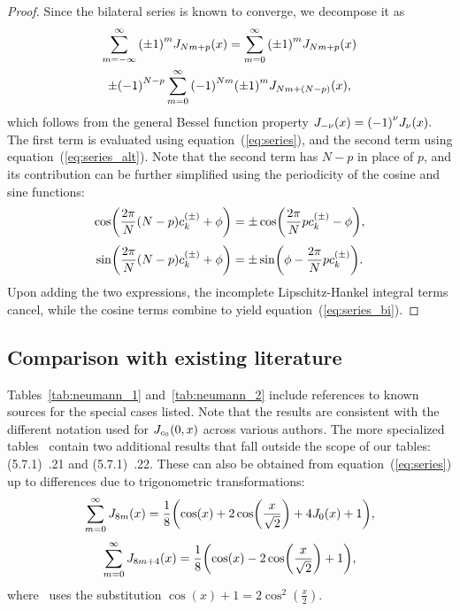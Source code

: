 \documentclass{article}
\begin{document}
\begin{proof}
Since the bilateral series is known to converge, we decompose it as
\begin{multline}
\sum_{m=-\infty}^{\infty} \qty(\pm 1)^m J_{N m+p}(x) = \sum_{m=0}^{\infty} \qty(\pm 1)^m J_{N m+p}(x) \\
\pm \qty(-1)^{N-p} \sum_{m=0}^{\infty} \qty(-1)^{Nm} \qty(\pm 1)^m J_{N m+\qty(N-p)}(x),
\end{multline}
which follows from the general Bessel function property $J_{-\nu}(x) = \qty(-1)^\nu J_{\nu}(x).$
The first term is evaluated using equation~(\ref{eq:series}), and the second term using equation~(\ref{eq:series_alt}).
Note that the second term has $N-p$ in place of $p$, and its contribution can be further simplified using the periodicity of the cosine and sine functions:
\begin{equation}
\cos(\frac{2\pi}{N}\qty(N-p)c^{(\pm)}_k + \phi) = \pm \cos(\frac{2\pi}{N}pc^{(\pm)}_k - \phi),
\end{equation}
\begin{equation}
\sin(\frac{2\pi}{N}\qty(N-p)c^{(\pm)}_k + \phi) = \pm \sin(\phi - \frac{2\pi}{N}pc^{(\pm)}_k).
\end{equation}
Upon adding the two expressions, the incomplete Lipschitz-Hankel integral terms cancel, while the cosine terms combine to yield equation~(\ref{eq:series_bi}).
\end{proof}

\subsection{Comparison with existing literature}
Tables~\ref{tab:neumann_1} and~\ref{tab:neumann_2} include references to known sources for the special cases listed.
Note that the results are consistent with the different notation used for $\JC0(0, x)$ across various authors.
The more specialized tables~\cite{Prudnikov1986} contain two additional results that fall outside the scope of our tables: (5.7.1)~.21 and (5.7.1)~.22.
These can also be obtained from equation~(\ref{eq:series}) up to differences due to trigonometric transformations:
\begin{equation}
\sum_{m=0}^{\infty} J_{8m}(x) = \frac{1}{8} \qty(\cos(x)+2 \cos(\frac{x}{\sqrt{2}})+4 J_0(x)+1),
\end{equation}
\begin{equation}
\sum_{m=0}^{\infty} J_{8m+4}(x) = \frac{1}{8} \qty(\cos(x)-2 \cos(\frac{x}{\sqrt{2}})+1),
\end{equation}
where~\cite{Prudnikov1986} uses the substitution $\cos(x)+1 = 2\cos^2(\frac{x}{2})$.
\end{document}
